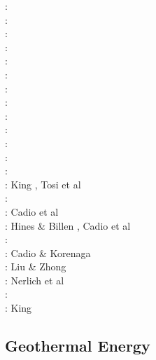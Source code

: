 \begin{scriptsize}
\nineteeneightyfour: \cite{davi84}\cite{hage84}\cite{riff84}\cite{riha84}\\
\nineteeneightyfive: \cite{hacr85}\\
\nineteeneightysix: \cite{davi86}\\
\nineteeneightyeight: \cite{besz88}\cite{fope88}\\
\nineteenninetytwo: \cite{zhgu92}\cite{kiha92}\\
\nineteenninetythree: \cite{zhch93}\cite{rirl93}\\
\nineteenninetyfour: \cite{kiha94}\\
\nineteenninetyfive: \cite{king95}\cite{mopa95}\\
\nineteenninetysix: \cite{mogu96}\\
\nineteenninetyseven: \cite{wean97a}\\
\nineteenninetyeight: \cite{cava98}\cite{chki98}\\
\twothousandone: \cite{zhon01}\\
\twothousandeight: \cite{meco08}\\
\twothousandnine: King \cite{king09}, Tosi et al \cite{tocm09}\\
\twothousandten: \cite{ghbz10}\cite{spgs10b}\\
\twothousandeleven: Cadio et al \cite{capd11}\\
\twothousandtwelve: Hines \& Billen \cite{hibi12}, Cadio et al \cite{cabp12}\\
\twothousandthirteen: \cite{shsc13}\cite{chus13}\\
\twothousandfourteen: Cadio \& Korenaga \cite{cako14}\\
\twothousandfifteen: Liu \& Zhong \cite{lizh15}\\
\twothousandsixteen: Nerlich et al \cite{necg16}\\
\twothousandseventeen: \cite{grab17}\\
\twothousandeighteen: King \cite{king18}
\end{scriptsize}

\subsection{Geothermal Energy} 

